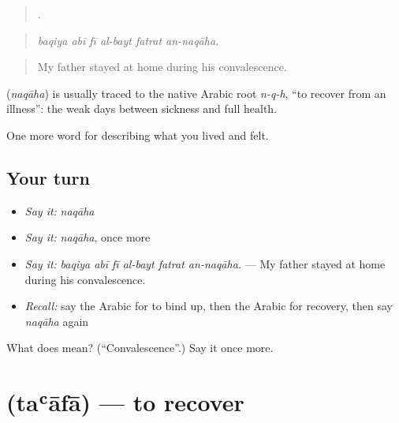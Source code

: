 \begin{quote}
     .
\end{quote}

\begin{quote}
\emph{baqiya abī fī al-bayt fatrat an-naqāha.}
\end{quote}

\begin{quote}
My father stayed at home during his convalescence.
\end{quote}

\begin{cousinweb}
\textbf{} (\emph{naqāha}) is usually traced to the native Arabic root \emph{n-q-h}, \textquotedblleft{}to recover from an illness\textquotedblright{}: the weak days between sickness and full health.
\end{cousinweb}

\begin{grammarlens}[title={What you've built}]
One more word for describing what you lived and felt.
\end{grammarlens}

\subsection*{Your turn}
\begin{itemize}
\raggedright
  \item \emph{Say it:} \emph{naqāha}
  \item \emph{Say it:} \emph{naqāha}, once more
  \item \emph{Say it:} \emph{baqiya abī fī al-bayt fatrat an-naqāha.} — My father stayed at home during his convalescence.
  \item \emph{Recall:} say the Arabic for to bind up, then the Arabic for recovery, then say \emph{naqāha} again
\end{itemize}

\begin{tcolorbox}[breakable,colback=teal!4,colframe=teal!35!black,title={Before you move on}]
What does  mean? (\textquotedblleft{}Convalescence\textquotedblright{}.) Say it once more.
\end{tcolorbox}
\section[\texorpdfstring{\ar{تعافى} (taʿāfā)}{تعافى (taʿāfā)}]{ (taʿāfā) — to recover}

